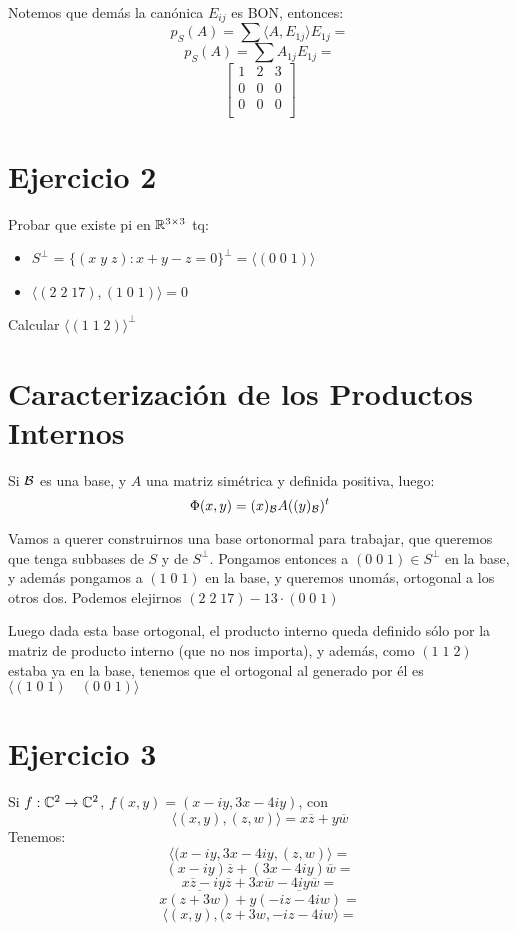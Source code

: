 \documentclass{article}
\begin{document}
Notemos que demás la canónica $E_{ij}$ es BON, entonces:
\[p_S(A) = \sum \langle A, E_{1j} \rangle E_{1j} =\]
\[p_S(A) = \sum A_{1j} E_{1j} =\]
\[
    \begin{bmatrix}
        1 & 2 & 3 \\
        0 & 0 & 0 \\
        0 & 0 & 0 \\
    \end{bmatrix}
\]

\section*{Ejercicio 2}
Probar que existe pi en $\mathbb{R}^{3 \times 3}$ tq:
\begin{itemize}
    \item $S^\perp$ = $\{(x \; y \; z) : x+y-z = 0\}^\perp = \langle(0 \; 0 \; 1)\rangle$
    \item $\langle (2 \; 2 \; 17), (1 \; 0 \; 1) \rangle = 0$
\end{itemize}
Calcular $\langle (1 \; 1 \; 2) \rangle ^ \perp$

\section*{Caracterización de los Productos Internos}
Si $\mathcal{B}$ es una base, y $A$ una matriz simétrica y definida positiva, luego:
\[
    \Phi(x,y) = (x)_{\mathcal{B}} A((y)_{\mathcal{B}})^t
\]

Vamos a querer construirnos una base ortonormal para trabajar, que queremos que tenga subbases de $S$ y de $S^\perp$. Pongamos entonces a $(0 \; 0 \; 1) \in S^\perp$ en la base, y además pongamos a $(1 \; 0 \; 1)$ en la base, y queremos unomás, ortogonal a los otros dos. Podemos elejirnos $(2 \; 2 \; 17) - 13 \cdot (0 \; 0 \; 1)$

Luego dada esta base ortogonal, el producto interno queda definido sólo por la matriz de producto interno (que no nos importa), y además, como $(1 \; 1 \; 2)$ estaba ya en la base, tenemos que el ortogonal al generado por él es $\langle (1 \; 0 \; 1) \quad (0 \; 0 \; 1) \rangle$

\section*{Ejercicio 3}
Si $f : \mathbb{C}^2 \to \mathbb{C}^2$, $f(x,y) = (x - iy, 3x - 4iy)$, con
\[\langle (x,y), (z,w) \rangle = x\overline z + y \overline w\]
Tenemos:
\[\langle(x-iy, 3x-4iy, (z,w)\rangle =\]
\[(x-iy)\overline z + (3x-4iy) \overline w =\]
\[x\overline z-iy\overline z + 3x\overline w -4iy \overline w =\]
\[x\overline {(z + 3w)} + y\overline {(-iz -4i w)} =\]
\[\langle (x, y), (z + 3w, -iz -4i w \rangle =\]
\end{document}
